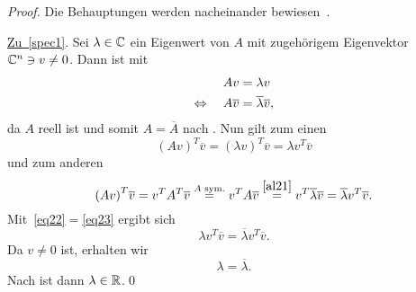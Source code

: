 \begin{proof}
    Die Behauptungen werden nacheinander bewiesen~\cite{proof:SpectralTom}.

    \vspace{5pt}
    \underline{Zu~\ref{spec1}}. Sei \(\lambda \in \mathbb{C}\) ein Eigenwert von \(A\) mit zugehörigem Eigenvektor \(\mathbb{C}^{n} \ni v \neq 0 \). 
    Dann ist mit 
    \begin{align}
        Av &=\lambda v \notag \label{al21}\\
        \Leftrightarrow \quad A\overline{v} &= \overline{\lambda}\overline{v},
    \end{align}
    da \(A\) reell ist und somit \(A=\overline{A}\) nach . 
    Nun gilt zum einen
    \begin{equation}
        {\left(Av\right)}^T \overline{v} = {\left(\lambda v\right)}^{T} \overline{v} = \lambda {v}^{T} \overline{v} \label{eq22}
    \end{equation}
    und zum anderen
    \begin{equation}
        {\left(Av\right)}^T \overline{v} = v^{T}A^{T}\overline{v} \overset{A\text{ sym.}}{=} v^{T}A\overline{v} \overset{\eqref{al21}}{=} v^{T}\overline{\lambda}\overline{v} = \overline{\lambda}v^{T}\overline{v}. \label{eq23}
    \end{equation}
    Mit~\eqref{eq22}\(=\)\eqref{eq23} ergibt sich
    \begin{equation*}
        \lambda v^{T}\overline{v} = \overline{\lambda}v^{T}\overline{v} .
    \end{equation*}
    Da \(v \neq 0\) ist, erhalten wir
    \begin{equation*}
        \lambda = \overline{\lambda}.
    \end{equation*}
    Nach  ist dann \(\lambda \in \mathbb{R}\).\qed
    \vspace{5pt} 


\end{proof}
